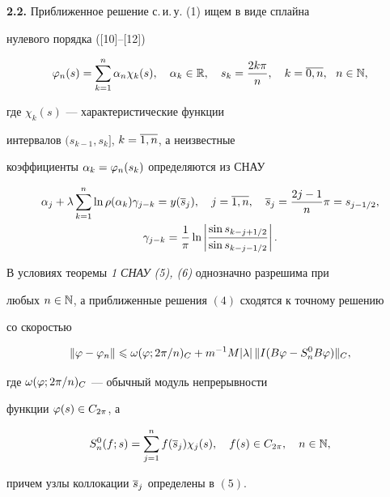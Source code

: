 {\bf 2.2.} Приближенное решение с.\,и.\,у. (1) ищем в виде сплайна 


нулевого порядка ([10]--[12])


\begin{equation}


\vp_n(s) = \suml_{k=1}^n\alpha_n\chi_k(s),\quad \alpha_k\in\R,\quad


s_k = \frac{2k\pi}{n},\quad 


k=\ol{0,n},\ \ n\in\N,


\end{equation}


где $\chi_k(s)$ --- характеристические функции 


интервалов $(s_{k-1},s_k]$, $k=\overline{1,n}$, а неизвестные 


коэффициенты $\alpha_k=\varphi_n(s_k)$ определяются из СНАУ


\begin{gather}


\alpha_j + \lambda\sum_{k=1}^n\ln \rho(\alpha_k)\gamma_{j-k} =


y(\ol{s}_j),\quad j=\ol{1,n},\quad \ol{s}_j = \frac{2j-1}{n}\pi=s_{j-1/2},\\


%


\gamma_{j-k} = \frac{1}{\pi}\ln\left|\frac{\sin s_{k-j+1/2}}


{\sin s_{k-j-1/2}}\right|.


\end{gather}





\begin{thm}


В условиях теоремы {\em 1 СНАУ (5), (6)} однозначно разрешима при 


любых $n\in\Bbb N$, а приближенные решения $(4)$ сходятся к точному решению 


со скоростью


$$


\|\vp - \vp_n\|\lea \omega(\vp;2\pi/n)_C +


m^{-1}M|\lambda|\,\|I(B\vp - S_n^0B\vp)\|_C,


$$


где $\omega(\varphi;2\pi/n)_C$ --- обычный модуль непрерывности 


функции $\varphi(s)\in C_{2\pi}$, а 


$$


S_n^0(f;s) = \sum_{j=1}^n f(\ol{s}_j)\chi_j(s),\quad


f(s)\in C_{2\pi},\quad n\in\N,


$$


причем узлы коллокации $\overline{s}_j$ определены в $(5)$.


\end{thm}






